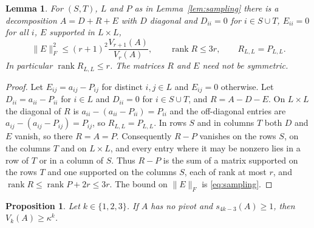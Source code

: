 \documentclass[11pt]{amsart}
\numberwithin{equation}{section}
\newtheorem{lemma}[theorem]{Lemma}
\newtheorem{proposition}[theorem]{Proposition}
\theoremstyle{definition}
\theoremstyle{remark}
\newcommand{\1}{\mathbf 1}
\DeclareMathOperator{\rank}{rank}
\newcommand{\norm}[1]{\lVert #1\rVert}
\begin{document}
\begin{lemma}\label{lem:completion}
For $(S,T)$, $L$ and $P$ as in Lemma~\ref{lem:sampling} there is a decomposition $A=D+R+E$ with $D$ diagonal and $D_{ii}=0$ for $i\in S\cup T$, $E_{ii}=0$ for all $i$, $E$ supported in $L\times L$,
\[
\norm E_F^2\le(r+1)^2\frac{V_{r+1}(A)}{V_r(A)},\qquad\rank R\le3r,\qquad R_{L,L}=P_{L,L}.
\]
In particular $\rank R_{L,L}\le r$. The matrices $R$ and $E$ need not be symmetric.
\end{lemma}

\begin{proof}
Let $E_{ij}=a_{ij}-P_{ij}$ for distinct $i,j\in L$ and $E_{ij}=0$ otherwise. Let $D_{ii}=a_{ii}-P_{ii}$ for $i\in L$ and $D_{ii}=0$ for $i\in S\cup T$, and $R=A-D-E$. On $L\times L$ the diagonal of $R$ is $a_{ii}-(a_{ii}-P_{ii})=P_{ii}$ and the off-diagonal entries are $a_{ij}-(a_{ij}-P_{ij})=P_{ij}$, so $R_{L,L}=P_{L,L}$. In rows $S$ and in columns $T$ both $D$ and $E$ vanish, so there $R=A=P$. Consequently $R-P$ vanishes on the rows $S$, on the columns $T$ and on $L\times L$, and every entry where it may be nonzero lies in a row of $T$ or in a column of $S$. Thus $R-P$ is the sum of a matrix supported on the rows $T$ and one supported on the columns $S$, each of rank at most $r$, and $\rank R\le\rank P+2r\le3r$. The bound on $\norm E_F$ is \eqref{eq:sampling}.
\end{proof}

\begin{proposition}\label{prop:volume}
Let $k\in\{1,2,3\}$. If $A$ has no pivot and $s_{4k-3}(A)\ge1$, then $V_k(A)\ge\kappa^k$.
\end{proposition}
\end{document}
